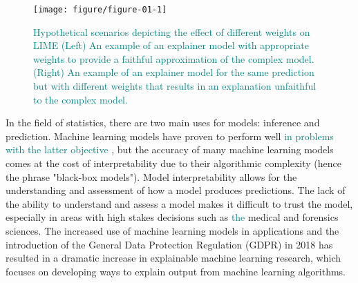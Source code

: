\documentclass[AMS,STIX2COL]{WileyNJD-v2}\usepackage[]{graphicx}\usepackage[]{color}
\newenvironment{knitrout}{}{} %
\newcommand{\kge}[1]{\textcolor{teal}{#1}}
\renewcommand{\sout}[1]{\unskip}
\begin{document}
\begin{figure}[!thp]
\begin{knitrout}
\color{fgcolor}

{\centering \texttt{[image: figure/figure-01-1]} 

}



\end{knitrout}
\caption{\kge{Hypothetical scenarios depicting the effect of different weights on LIME (Left) An example of an explainer model with appropriate weights to provide a faithful approximation of the complex model. (Right) An example of an explainer model for the same prediction but with different weights that results in an explanation unfaithful to the complex model.} \sout{A conceptual depiction of a faithful LIME explainer model in the immediate neighborhood of a prediction of interest \kge{for a hypothetical black-box model trained using two features: Feature 1 (left) and Feature 2 (right). The explainer model is a ridge regression weighted by the inverse Gower distance to the prediction of interest raised to the power of \ensuremath{5\times 10^{-17}}.}} \sout{The predictions from a hypothetical black-box model are plotted against the standardized values of the two hypothetical predictor variables. The diamond shaped points represent the location of a prediction of interest. The size and opacity of the circular points indicate the weight assigned based on the distance to the prediction of interest computed using the inverse of the Gower distance metric raised to the power of \ensuremath{5\times 10^{-17}}. The black lines represent a weighted ridge regression model used as an explainer model that reasonably captures the relationship between the black-box predictions and the features in a local region around the prediction of interest. That is, the explainer is faithful to the complex model and produces a reasonable explanation that Feature 1 plays a more important role in the prediction of interest than Feature 2 since the magnitude of the slope associated with Feature 1 is larger.}}
\label{fig:figure-01}
\end{figure}

In the field of statistics, there are two main uses for models: inference and prediction. Machine learning models \sout{are often used for the latter purpose. These models} have proven to perform well \kge{in problems with the latter objective} \sout{in a wide range of prediction problems}, but the accuracy of many machine learning models comes at the cost of interpretability due to their algorithmic complexity (hence the phrase "black-box models"). Model interpretability allows for the understanding and assessment of how a model produces predictions. The lack of the ability to understand and assess a model makes it difficult to trust the model, especially in areas with high stakes decisions such as \kge{the} medical and forensics sciences. The increased use of machine learning models in applications and the introduction of the General Data Protection Regulation (GDPR) in 2018 \citep{goodman:2016} has resulted in a dramatic increase in explainable machine learning research, which focuses on developing ways to explain output from machine learning algorithms.
\end{document}
